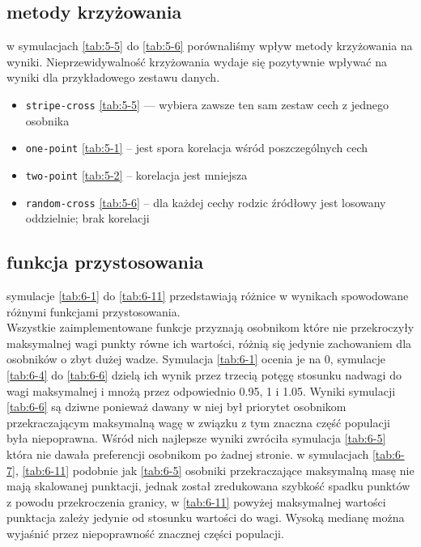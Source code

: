 \documentclass{article}
\newcommand{\cljt}[1]{\texttt{#1}}
\newcommand{\inputgraph}[1]{\newpage \newpage} %
\begin{document}
\subsection{metody krzyżowania}
w symulacjach \ref{tab:5-5} do \ref{tab:5-6} porównaliśmy wpływ metody
krzyżowania na wyniki. Nieprzewidywalność krzyżowania wydaje się pozytywnie
wpływać na wyniki dla przykładowego zestawu danych.
\begin{itemize}
	\item \cljt{stripe-cross} \ref{tab:5-5} --- wybiera zawsze ten sam zestaw cech z jednego osobnika
	\item \cljt{one-point} \ref{tab:5-1} -- jest spora korelacja wśród poszczególnych cech
	\item \cljt{two-point} \ref{tab:5-2} -- korelacja jest mniejsza
	\item \cljt{random-cross} \ref{tab:5-6} -- dla każdej cechy rodzic źródłowy jest losowany
	      oddzielnie; brak korelacji
\end{itemize}

\inputgraph{5-5.transient.tex}
\inputgraph{5-1.transient.tex}
\inputgraph{5-2.transient.tex}
\inputgraph{5-6.transient.tex}
\subsection{funkcja przystosowania}
symulacje \ref{tab:6-1} do \ref{tab:6-11} przedstawiają różnice w wynikach
spowodowane różnymi funkcjami przystosowania. \\
Wszystkie zaimplementowane funkcje przyznają osobnikom które nie przekroczyły maksymalnej wagi
punkty równe ich wartości, różnią się jedynie zachowaniem dla osobników o zbyt
dużej wadze.
Symulacja \ref{tab:6-1} ocenia je na 0, symulacje \ref{tab:6-4} do \ref{tab:6-6} dzielą ich wynik przez trzecią potęgę stosunku
nadwagi do wagi maksymalnej i mnożą przez odpowiednio 0.95, 1 i 1.05.
Wyniki symulacji \ref{tab:6-6} są dziwne ponieważ dawany w niej był priorytet
osobnikom przekraczającym maksymalną wagę w związku z tym znaczna część
populacji była niepoprawna. Wśród nich najlepsze wyniki
zwróciła symulacja \ref{tab:6-5} która nie dawała preferencji osobnikom po
żadnej stronie. w symulacjach \ref{tab:6-7}, \ref{tab:6-11} podobnie jak
\ref{tab:6-5} osobniki przekraczające maksymalną masę nie mają skalowanej
punktacji, jednak został zredukowana szybkość spadku punktów z powodu przekroczenia
granicy, w \ref{tab:6-11} powyżej maksymalnej wartości punktacja zależy jedynie
od stosunku wartości do wagi. Wysoką medianę można wyjaśnić przez niepoprawność
znacznej części populacji.
\inputgraph{6-1.transient.tex}
\inputgraph{6-4.transient.tex}
\inputgraph{6-5.transient.tex}
\inputgraph{6-6.transient.tex}
\inputgraph{6-7.transient.tex}
\inputgraph{6-8.transient.tex}
\inputgraph{6-9.transient.tex}
\inputgraph{6-10.transient.tex}
\inputgraph{6-11.transient.tex}
\end{document}
